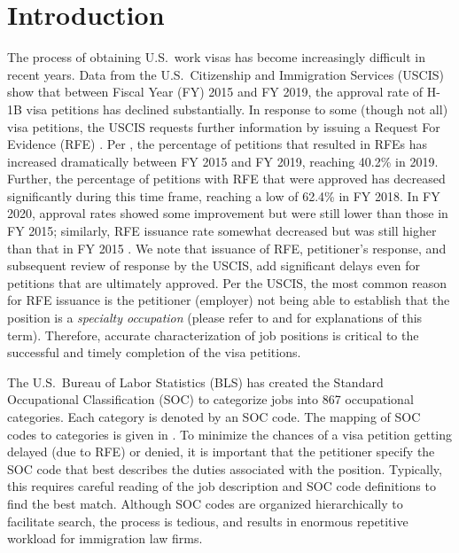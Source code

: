 \section{Introduction}
\label{sec:Introduction}

The process of obtaining U.S.~work visas has become increasingly difficult in recent years. Data from the U.S.~Citizenship and Immigration Services (USCIS) \cite{uscis-rfe-stats} show that between Fiscal Year (FY) 2015 and FY 2019, the approval rate of H-1B visa petitions has declined substantially. In response to some (though not all) visa petitions, the USCIS requests further information by issuing a Request For Evidence (RFE) \cite{RFE}. Per \cite{uscis-rfe-stats}, the percentage of petitions that resulted in RFEs has increased dramatically between FY 2015 and FY 2019, reaching 40.2\% in 2019. Further, the percentage of petitions with RFE that were approved has decreased significantly during this time frame, reaching a low of 62.4\% in FY 2018. In FY 2020, approval rates showed some improvement but were still lower than those in FY 2015; similarly, RFE issuance rate somewhat decreased but was still higher than that in FY 2015 \cite{bal-rfe-stats}. We note that issuance of RFE, petitioner's response, and subsequent review of response by the USCIS, add significant delays even for petitions that are ultimately approved. Per the USCIS, the most common reason for RFE issuance is the petitioner (employer) not being able to establish that the position is a \textit{specialty occupation} \cite{RFE}  (please refer to \cite{H1B} and \cite{SpecialtyOccupation} for explanations of this term). Therefore, accurate characterization of job positions is critical to the successful and timely completion of the visa petitions.

The U.S.~Bureau of Labor Statistics (BLS) has created the Standard Occupational Classification (SOC) \cite{SOC-1} to categorize jobs into 867 occupational categories. Each category is denoted by an SOC code. The mapping of SOC codes to categories is given in \cite{SOC-2}. To minimize the chances of a visa petition getting delayed (due to RFE) or denied, it is important that the petitioner specify the SOC code that best describes the duties associated with the position. Typically, this requires careful reading of the job description and SOC code definitions to find the best match. Although SOC codes are organized hierarchically to facilitate search, the process is tedious, and results in enormous repetitive workload for immigration law firms.

